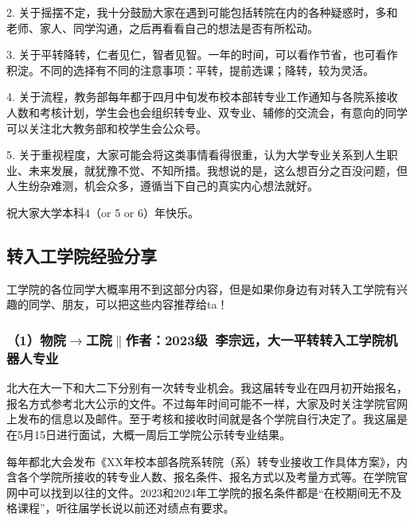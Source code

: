 \documentclass[11pt,oneside]{book}
\begin{document}
\vspace{10pt}

2. 关于摇摆不定，我十分鼓励大家在遇到可能包括转院在内的各种疑惑时，多和老师、家人、同学沟通，之后再看看自己的想法是否有所松动。

\vspace{10pt}

3. 关于平转降转，仁者见仁，智者见智。一年的时间，可以看作节省，也可看作积淀。不同的选择有不同的注意事项：平转，提前选课；降转，较为灵活。

\vspace{10pt}

4. 关于流程，教务部每年都于四月中旬发布校本部转专业工作通知与各院系接收人数和考核计划，学生会也会组织转专业、双专业、辅修的交流会，有意向的同学可以关注北大教务部和校学生会公众号。

\vspace{10pt}

5. 关于重视程度，大家可能会将这类事情看得很重，认为大学专业关系到人生职业、未来发展，就犹豫不觉、不知所措。我想说的是，这么想百分之百没问题，但人生纷杂难测，机会众多，遵循当下自己的真实内心想法就好。

\vspace{10pt}

祝大家大学本科4（or 5 or 6）年快乐。

\subsection{转入工学院经验分享}

工学院的各位同学大概率用不到这部分内容，但是如果你身边有对转入工学院有兴趣的同学、朋友，可以把这些内容推荐给ta！

\subsubsection{（1）物院$\to$工院$\parallel$作者：2023级\ 李宗远，大一平转转入工学院机器人专业}

北大在大一下和大二下分别有一次转专业机会。我这届转专业在四月初开始报名，报名方式参考北大公示的文件。不过每年时间可能不一样，大家及时关注学院官网上发布的信息以及邮件。至于考核和接收时间就是各个学院自行决定了。我这届是在5月15日进行面试，大概一周后工学院公示转专业结果。

\vspace{10pt}

每年都北大会发布《XX年校本部各院系转院（系）转专业接收工作具体方案》，内含各个学院所接收的转专业人数、报名条件、报名方式以及考量方式等。在学院官网中可以找到以往的文件。2023和2024年工学院的报名条件都是“在校期间无不及格课程”，听往届学长说以前还对绩点有要求。
\end{document}
